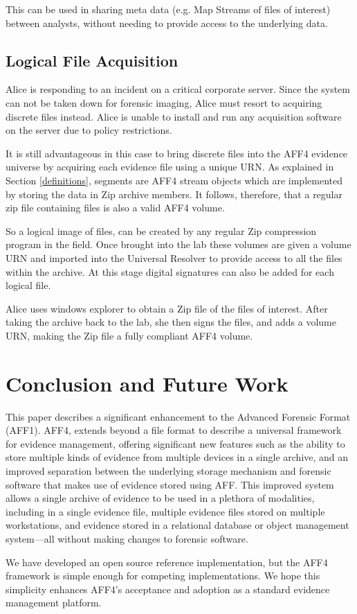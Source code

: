 \documentclass[10pt, conference]{IEEEtran}
\begin{document}
This can be used in sharing meta data (e.g. Map Streams of files of
interest) between analysts, without needing to provide access to the
underlying data.

\subsection{Logical File Acquisition}
Alice is responding to an incident on a critical corporate
server. Since the system can not be taken down for forensic imaging,
Alice must resort to acquiring discrete files instead. Alice is unable
to install and run any acquisition software on the server due to
policy restrictions.

It is still advantageous in this case to bring discrete files into the
AFF4 evidence universe by acquiring each evidence file using a unique
URN. As explained in Section \ref{definitions}, segments are AFF4 stream
objects which are implemented by storing the data in Zip archive
members. It follows, therefore, that a regular zip file containing
files is also a valid AFF4 volume.

So a logical image of files, can be created by any regular Zip
compression program in the field. Once brought into the lab these
volumes are given a volume URN and imported into the Universal
Resolver to provide access to all the files within the archive. At
this stage digital signatures can also be added for each logical file.

Alice uses windows explorer to obtain a Zip file of the files of
interest. After taking the archive back to the lab, she then signs the
files, and adds a volume URN, making the Zip file a fully compliant
AFF4 volume.

\section{Conclusion and Future Work}

This paper describes a significant enhancement to the Advanced
Forensic Format (AFF1). AFF4, extends beyond a file format to describe
a universal framework for evidence management, offering significant
new features such as the ability to store multiple kinds of evidence
from multiple devices in a single archive, and an improved separation
between the underlying storage mechanism and forensic software that
makes use of evidence stored using AFF. This improved system allows a
single archive of evidence to be used in a plethora of modalities,
including in a single evidence file, multiple evidence files stored on
multiple workstations, and evidence stored in a relational database or
object management system---all without making changes to forensic
software.

We have developed an open source reference implementation, but the
AFF4 framework is simple enough for competing implementations. We hope
this simplicity enhances AFF4's acceptance and adoption as a standard
evidence management platform.



\end{document}
